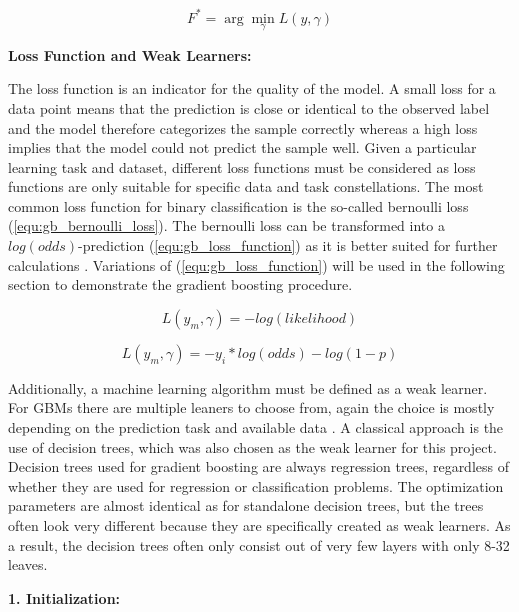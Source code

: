 \begin{equation}
    F^{*} = \arg \min_{\gamma} L(y,\gamma)
    \label{equ:gb_theory}
\end{equation}

\textbf{Loss Function and Weak Learners:}

The loss function is an indicator for the quality of the model. A small loss for a data point 
means that the prediction is close or identical to the observed label and the model therefore 
categorizes the sample correctly whereas a high loss implies that the model could not predict 
the sample well. Given a particular learning task and dataset, different loss functions must 
be considered as loss functions are only suitable for specific data and task constellations. The most common 
loss function for binary classification is the so-called bernoulli loss (\ref{equ:gb_bernoulli_loss}). The bernoulli loss 
can be transformed into a \(log(odds)\)-prediction (\ref{equ:gb_loss_function}) as it is better suited for further calculations \cite[3.1]{Natekin2013} \cite{bischl2022introduction_ml_bernoulli_loss}. 
Variations of (\ref{equ:gb_loss_function}) will be used in the following section to demonstrate the gradient boosting 
procedure.

\begin{equation}
    L(y_{m}, \gamma) = - log(likelihood)
    \label{equ:gb_bernoulli_loss}
\end{equation} 

\begin{equation}
    L(y_{m}, \gamma) = - y_{i} * log(odds) - log(1-p)
    \label{equ:gb_loss_function}
\end{equation}

Additionally, a machine learning algorithm must be defined as a weak learner. For \ac{GBM}s there 
are multiple leaners to choose from, again the choice is mostly depending on the prediction 
task and available data \cite[3.2]{Natekin2013}. A classical approach is the use of decision trees, which was also 
chosen as the weak learner for this project. Decision trees used for gradient boosting are 
always regression trees, regardless of whether they are used for regression or classification 
problems. The optimization parameters are almost identical as for standalone decision trees, 
but the trees often look very different because they are specifically created as weak learners. 
As a result, the decision trees often only consist out of very few layers with only 8-32 leaves.

\textbf{1. Initialization:}

